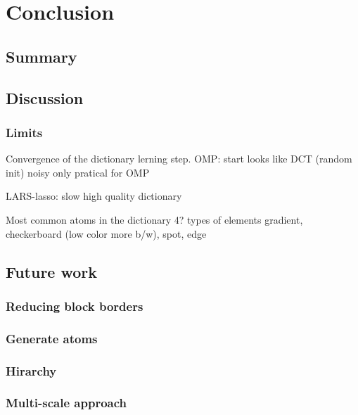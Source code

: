 \chapter{Conclusion}
\thispagestyle{empty}
\section{Summary} %

\section{Discussion}
\subsection*{Limits}
Convergence of the dictionary lerning step.
OMP:
  start looks like DCT (random init)
  noisy
  only pratical for OMP

LARS-lasso:
  slow 
  high quality dictionary

  Most common atoms in the dictionary 
  4? types of elements
  gradient, checkerboard (low color more b/w), spot, edge

\section{Future work}
\subsection*{Reducing block borders}
\subsection*{Generate atoms}
\subsection*{Hirarchy}
\subsection*{Multi-scale approach}